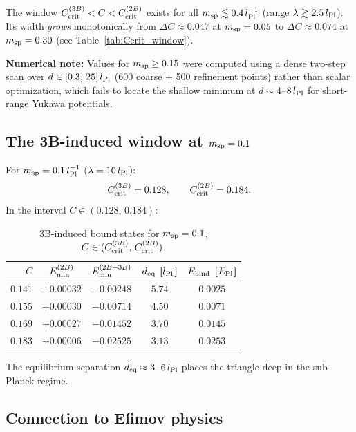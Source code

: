 \noindent
The window $C_{\rm crit}^{(3B)} < C < C_{\rm crit}^{(2B)}$ exists for
all $m_{\rm sp} \lesssim 0.4\,l_{\rm Pl}^{-1}$ (range $\lambda\gtrsim 2.5\,l_{\rm Pl}$).
Its width \emph{grows} monotonically from $\Delta C \approx 0.047$ at
$m_{\rm sp}=0.05$ to $\Delta C \approx 0.074$ at $m_{\rm sp}=0.30$
(see Table~\ref{tab:Ccrit_window}).

\textbf{Numerical note:} Values for $m_{\rm sp}\geq0.15$ were computed
using a dense two-step scan over $d\in[0.3,\,25]\,l_{\rm Pl}$ (600
coarse + 500 refinement points) rather than scalar optimization, which
fails to locate the shallow minimum at $d\sim4$--$8\,l_{\rm Pl}$ for
short-range Yukawa potentials.

\subsection{The 3B-induced window at $m_{\rm sp}=0.1$}

For $m_{\rm sp}=0.1\,l_{\rm Pl}^{-1}$ ($\lambda=10\,l_{\rm Pl}$):
\begin{equation}
  C_{\rm crit}^{(3B)} = 0.128, \qquad
  C_{\rm crit}^{(2B)} = 0.184.
\end{equation}
In the interval $C\in(0.128,\,0.184)$:

\begin{table}[h]
\centering
\caption{3B-induced bound states for $m_{\rm sp}=0.1$, $C\in(C_{\rm crit}^{(3B)},\,C_{\rm crit}^{(2B)})$.}
\label{tab:3b_induced}
\begin{tabular}{rcccc}
\hline
$C$ & $E_{\rm min}^{(2B)}$ & $E_{\rm min}^{(2B+3B)}$ & $d_{\rm eq}$ [$l_{\rm Pl}$] & $E_{\rm bind}$ [$E_{\rm Pl}$] \\
\hline
$0.141$ & $+0.00032$ & $-0.00248$ & $5.74$ & $0.0025$ \\
$0.155$ & $+0.00030$ & $-0.00714$ & $4.50$ & $0.0071$ \\
$0.169$ & $+0.00027$ & $-0.01452$ & $3.70$ & $0.0145$ \\
$0.183$ & $+0.00006$ & $-0.02525$ & $3.13$ & $0.0253$ \\
\hline
\end{tabular}
\end{table}

\noindent
The equilibrium separation $d_{\rm eq}\approx3$--$6\,l_{\rm Pl}$ places
the triangle deep in the sub-Planck regime.

\subsection{Connection to Efimov physics}

